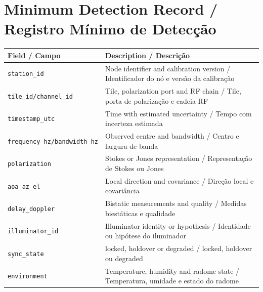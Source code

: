 \chapter{Minimum Detection Record / Registro Mínimo de Detecção}

\begin{longtable}{p{}p{}}
\toprule
\textbf{Field / Campo} & \textbf{Description / Descrição}\\
\midrule
\texttt{station\_id} & Node identifier and calibration version / Identificador do nó e versão da calibração\\
\texttt{tile\_id/channel\_id} & Tile, polarization port and RF chain / Tile, porta de polarização e cadeia RF\\
\texttt{timestamp\_utc} & Time with estimated uncertainty / Tempo com incerteza estimada\\
\texttt{frequency\_hz/bandwidth\_hz} & Observed centre and bandwidth / Centro e largura de banda\\
\texttt{polarization} & Stokes or Jones representation / Representação de Stokes ou Jones\\
\texttt{aoa\_az\_el} & Local direction and covariance / Direção local e covariância\\
\texttt{delay\_doppler} & Bistatic measurements and quality / Medidas biestáticas e qualidade\\
\texttt{illuminator\_id} & Illuminator identity or hypothesis / Identidade ou hipótese do iluminador\\
\texttt{sync\_state} & locked, holdover or degraded / locked, holdover ou degraded\\
\texttt{environment} & Temperature, humidity and radome state / Temperatura, umidade e estado do radome\\
\bottomrule
\end{longtable}
